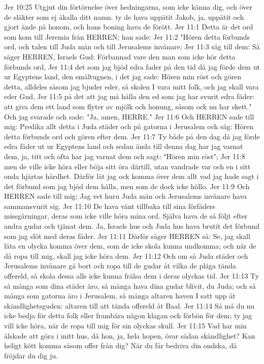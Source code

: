 Jer 10:25  Utgjut din förtörnelse över hedningarna, som icke känna dig, och över de släkter som ej åkalla ditt namn. ty de hava uppätit Jakob, ja, uppätit och gjort ände på honom, och hans boning hava de förött.
Jer 11:1  Detta är det ord som kom till Jeremia från HERREN; han sade:
Jer 11:2  "Hören detta förbunds ord, och talen till Juda män och till Jerusalems invånare;
Jer 11:3  säg till dem: Så säger HERREN, Israels Gud: Förbannad vare den man som icke hör detta förbunds ord,
Jer 11:4  det som jag bjöd edra fader på den tid då jag förde dem ut ur Egyptens land, den smältugnen, i det jag sade: Hören min röst och gören detta, alldeles såsom jag bjuder eder, så skolen I vara mitt folk, och jag skall vara eder Gud,
Jer 11:5  på det att jag må hålla den ed som jag har svurit edra fäder: att giva dem ett land som flyter av mjölk och honung, såsom ock nu har skett." Och jag svarade och sade: "Ja, amen, HERRE."
Jer 11:6  Och HERREN sade till mig: Predika allt detta i Juda städer och på gatorna i Jerusalem och säg: Hören detta förbunds ord och gören efter dem.
Jer 11:7  Ty både på den dag då jag förde edra fäder ut ur Egyptens land och sedan ända till denna dag har jag varnat dem, ja, titt och ofta har jag varnat dem och sagt: "Hören min röst";
Jer 11:8  men de ville icke höra eller böja sitt öra därtill, utan vandrade var och en i sitt onda hjärtas hårdhet. Därför lät jag ock komma över dem allt vad jag hade sagt i det förbund som jag bjöd dem hålla, men som de dock icke höllo.
Jer 11:9  Och HERREN sade till mig: Jag vet huru Juda män och Jerusalems invånare hava sammansvurit sig.
Jer 11:10  De hava vänt tillbaka till sina förfäders missgärningar, deras som icke ville höra mina ord. Själva hava de så följt efter andra gudar och tjänat dem. Ja, Israels hus och Juda hus hava brutit det förbund som jag slöt med deras fäder.
Jer 11:11  Därför säger HERREN så: Se, jag skall låta en olycka komma över dem, som de icke skola kunna undkomma; och när de då ropa till mig, skall jag icke höra dem.
Jer 11:12  Och om så Juda städer och Jerusalems invånare gå bort och ropa till de gudar åt vilka de pläga tända offereld, så skola dessa alls icke kunna frälsa dem i deras olyckas tid.
Jer 11:13  Ty så många som dina städer äro, så många hava dina gudar blivit, du Juda; och så många som gatorna äro i Jerusalem, så många altaren haven I satt upp åt skändlighetsguden: altaren till att tända offereld åt Baal.
Jer 11:14  Så må du nu icke bedja för detta folk eller frambära någon klagan och förbön för dem; ty jag vill icke höra, när de ropa till mig för sin olyckas skull.
Jer 11:15  Vad har min älskade att göra i mitt hus, då hon, ja, hela hopen, övar sådan skändlighet? Kan heligt kött komma såsom offer från dig? När du får bedriva din ondska, då fröjdar du dig ju.
